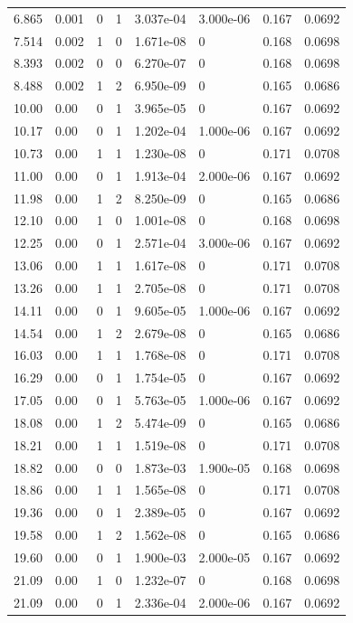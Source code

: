 \documentclass[preview]{standalone}
\begin{document}
{{\begin{tabular}{L{1.2cm}C{1.2cm} C{0.3cm}C{0.5cm} C{1.4cm}C{1.4cm} C{1.4cm}C{1.4cm}}
  6.865  &  0.001  & 0     &  1 &  3.037e-04  & 3.000e-06  & 0.167 &  0.0692   \\ 
  7.514  &  0.002  & 1     &  0 &  1.671e-08  & 0  & 0.168 &  0.0698   \\ 
  8.393  &  0.002  & 0     &  0 &  6.270e-07  & 0  & 0.168 &  0.0698   \\ 
  8.488  &  0.002  & 1     &  2 &  6.950e-09  & 0  & 0.165 &  0.0686   \\ 
  10.00  &  0.00  & 0     &  1 &  3.965e-05  & 0  & 0.167 &  0.0692   \\ 
  10.17  &  0.00  & 0     &  1 &  1.202e-04  & 1.000e-06  & 0.167 &  0.0692   \\ 
  10.73  &  0.00  & 1     &  1 &  1.230e-08  & 0  & 0.171 &  0.0708   \\ 
  11.00  &  0.00  & 0     &  1 &  1.913e-04  & 2.000e-06  & 0.167 &  0.0692   \\ 
  11.98  &  0.00  & 1     &  2 &  8.250e-09  & 0  & 0.165 &  0.0686   \\ 
  12.10  &  0.00  & 1     &  0 &  1.001e-08  & 0  & 0.168 &  0.0698   \\ 
  12.25  &  0.00  & 0     &  1 &  2.571e-04  & 3.000e-06  & 0.167 &  0.0692   \\ 
  13.06  &  0.00  & 1     &  1 &  1.617e-08  & 0  & 0.171 &  0.0708   \\ 
  13.26  &  0.00  & 1     &  1 &  2.705e-08  & 0  & 0.171 &  0.0708   \\ 
  14.11  &  0.00  & 0     &  1 &  9.605e-05  & 1.000e-06  & 0.167 &  0.0692   \\ 
  14.54  &  0.00  & 1     &  2 &  2.679e-08  & 0  & 0.165 &  0.0686   \\ 
  16.03  &  0.00  & 1     &  1 &  1.768e-08  & 0  & 0.171 &  0.0708   \\ 
  16.29  &  0.00  & 0     &  1 &  1.754e-05  & 0  & 0.167 &  0.0692   \\ 
  17.05  &  0.00  & 0     &  1 &  5.763e-05  & 1.000e-06  & 0.167 &  0.0692   \\ 
  18.08  &  0.00  & 1     &  2 &  5.474e-09  & 0  & 0.165 &  0.0686   \\ 
  18.21  &  0.00  & 1     &  1 &  1.519e-08  & 0  & 0.171 &  0.0708   \\ 
  18.82  &  0.00  & 0     &  0 &  1.873e-03  & 1.900e-05  & 0.168 &  0.0698   \\ 
  18.86  &  0.00  & 1     &  1 &  1.565e-08  & 0  & 0.171 &  0.0708   \\ 
  19.36  &  0.00  & 0     &  1 &  2.389e-05  & 0  & 0.167 &  0.0692   \\ 
  19.58  &  0.00  & 1     &  2 &  1.562e-08  & 0  & 0.165 &  0.0686   \\ 
  19.60  &  0.00  & 0     &  1 &  1.900e-03  & 2.000e-05  & 0.167 &  0.0692   \\ 
  21.09  &  0.00  & 1     &  0 &  1.232e-07  & 0  & 0.168 &  0.0698   \\ 
  21.09  &  0.00  & 0     &  1 &  2.336e-04  & 2.000e-06  & 0.167 &  0.0692   \\ 
\hline 
\end{tabular} 

}}
\end{document}
